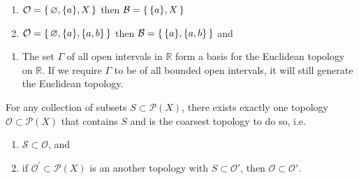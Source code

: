 \begin{example}
    \begin{enumerate}
        \item \(\mathcal{O} = \left\{\, \varnothing, \{a\}, X \,\right\}\) then \(\mathcal{B} = \left\{\, \{a\}, X \,\right\}\)
        \item \(\mathcal{O} = \left\{\, \varnothing, \{a\}, \{a, b\} \,\right\}\) then \(\mathcal{B} = \left\{\, \{a\}, \{a, b\} \,\right\}\) and 
    \end{enumerate}
\end{example}

\begin{exmbox}
    \begin{example}
        \begin{enumerate}
            \item The set \(\Gamma\) of all open intervals in \(\mathbb{R}\) form a basis for the Euclidean topology on \(\mathbb{R}\). If we require \(\Gamma\) to be of all bounded open intervals, it will still generate the Euclidean topology.
        \end{enumerate}
    \end{example}
\end{exmbox}

\begin{thmbox}
    \begin{lemma}
    For any collection of subsets \(S \subset \mathcal{P}(X)\), there exists exactly one topology \(\mathcal{O} \subset \mathcal{P}(X)\) that contains \(S\) and is the coarsest topology to do so, i.e.
    \begin{enumerate}
        \item \(\mathcal{S} \subset \mathcal{O}\), and
        \item if \(\mathcal{O}^\prime \subset \mathcal{P}(X)\) is an another topology with \(S \subset \mathcal{O}'\), then \(\mathcal{O} \subset \mathcal{O}'\).
    \end{enumerate}
    \end{lemma}
\end{thmbox}

